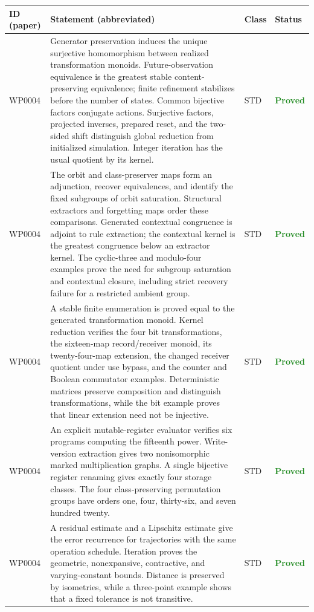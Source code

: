 \documentclass[11pt,a4paper]{article}
\newcommand{\stproved}{\textcolor{ForestGreen}{\textbf{Proved}}}
\begin{document}
{\small
\begin{longtable}{@{}p{2.1cm}p{6.6cm}p{1.0cm}p{2.6cm}@{}}
\toprule
\textbf{ID (paper)} & \textbf{Statement (abbreviated)} & \textbf{Class} & \textbf{Status} \\
\midrule
\endhead
WP0004 & Generator preservation induces the unique surjective homomorphism between realized transformation monoids. Future-observation equivalence is the greatest stable content-preserving equivalence; finite refinement stabilizes before the number of states. Common bijective factors conjugate actions. Surjective factors, projected inverses, prepared reset, and the two-sided shift distinguish global reduction from initialized simulation. Integer iteration has the usual quotient by its kernel. & STD & \stproved \\
WP0004 & The orbit and class-preserver maps form an adjunction, recover equivalences, and identify the fixed subgroups of orbit saturation. Structural extractors and forgetting maps order these comparisons. Generated contextual congruence is adjoint to rule extraction; the contextual kernel is the greatest congruence below an extractor kernel. The cyclic-three and modulo-four examples prove the need for subgroup saturation and contextual closure, including strict recovery failure for a restricted ambient group. & STD & \stproved \\
WP0004 & A stable finite enumeration is proved equal to the generated transformation monoid. Kernel reduction verifies the four bit transformations, the sixteen-map record/receiver monoid, its twenty-four-map extension, the changed receiver quotient under use bypass, and the counter and Boolean commutator examples. Deterministic matrices preserve composition and distinguish transformations, while the bit example proves that linear extension need not be injective. & STD & \stproved \\
WP0004 & An explicit mutable-register evaluator verifies six programs computing the fifteenth power. Write-version extraction gives two nonisomorphic marked multiplication graphs. A single bijective register renaming gives exactly four storage classes. The four class-preserving permutation groups have orders one, four, thirty-six, and seven hundred twenty. & STD & \stproved \\
WP0004 & A residual estimate and a Lipschitz estimate give the error recurrence for trajectories with the same operation schedule. Iteration proves the geometric, nonexpansive, contractive, and varying-constant bounds. Distance is preserved by isometries, while a three-point example shows that a fixed tolerance is not transitive. & STD & \stproved \\

\end{longtable}}
\end{document}

